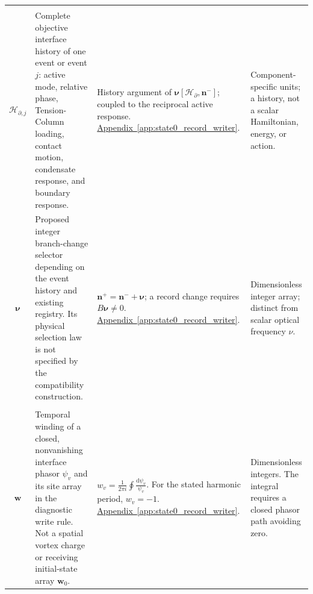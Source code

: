 \begin{longtable}{@{} c p{5.5cm} p{4cm} p{3.5cm} @{}}
\begin{tabular}[c]{@{}c@{}}
    $\mathcal H_{\partial}$ \\
    $\mathcal H_{\partial,j}$
\end{tabular}
& {\raggedright
Complete objective interface history of one event or event $j$:
active mode, relative phase, Tension-Column loading, contact motion,
condensate response, and boundary response.
\par}
& {\raggedright
History argument of
$\boldsymbol{\nu}[\mathcal H_{\partial},\mathbf n^{-}]$;
coupled to the reciprocal active response.
\newline
\hyperref[app:state0_record_writer]{Appendix~\ref*{app:state0_record_writer}}.
\par}
& {\raggedright
Component-specific units; a history, not a scalar Hamiltonian,
energy, or action.
\par} \\

$\boldsymbol{\nu}$
& {\raggedright
Proposed integer branch-change selector depending on the event
history and existing registry. Its physical selection law is not
specified by the compatibility construction.
\par}
& {\raggedright
$\mathbf n^{+}=\mathbf n^{-}+\boldsymbol{\nu}$;
a record change requires $B\boldsymbol{\nu}\neq0$.
\newline
\hyperref[app:state0_record_writer]{Appendix~\ref*{app:state0_record_writer}}.
\par}
& {\raggedright
Dimensionless integer array; distinct from scalar optical
frequency $\nu$.
\par} \\

\begin{tabular}[c]{@{}c@{}}
    $w_v$ \\
    $\mathbf w$
\end{tabular}
& {\raggedright
Temporal winding of a closed, nonvanishing interface phasor
$\psi_v$ and its site array in the diagnostic write rule.
Not a spatial vortex charge or receiving initial-state
array $\mathbf w_0$.
\par}
& {\raggedright
$\displaystyle
w_v=\frac{1}{2\pi i}\oint\frac{\mathrm d\psi_v}{\psi_v}$.
\newline
For the stated harmonic period, $w_v=-1$.
\newline
\hyperref[app:state0_record_writer]{Appendix~\ref*{app:state0_record_writer}}.
\par}
& {\raggedright
Dimensionless integers. The integral requires a closed phasor path
avoiding zero.
\par} \\


\end{longtable}
